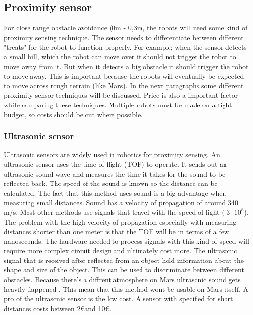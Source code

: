 \documentclass[10pt,a4paper]{article}
\begin{document}
\newpage

\subsection{Proximity sensor}
For close range obstacle avoidance (0m - 0,3m, the robots will need some kind of proximity sensing technique. The sensor needs to differentiate between different "treats" for the robot to function properly. For example; when the sensor detects a small hill, which the robot can move over it should not trigger the robot to move away from it. But when it detects a big obstacle it should trigger the robot to move away. This is important because the robots will eventually be expected to move across rough terrain (like Mars). In the next paragraphs some different proximity sensor techniques will be discussed. Price is also a important factor while comparing these techniques. Multiple robots must be made on a tight budget, so costs should be cut where possible.\\

\subsubsection{Ultrasonic sensor}
Ultrasonic sensors are widely used in robotics for proximity sensing. An ultrasonic sensor uses the time of flight (TOF) to operate. It sends out an ultrasonic sound wave and measures the time it takes for the sound to be reflected back. The speed of the sound is known so the distance can be calculated. The fact that this method uses sound is a big advantage when measuring small distances. Sound has a velocity of propagation of around 340 m/s. Most other methods use signals that travel with the speed of light ( $3\cdot10^{8}$). The problem with the high velocity of  propagation especially with measuring distances shorter than one meter is that the TOF will be in terms of a few nanoseconds.  The hardware needed to process signals with this kind of speed will require more complex circuit design and ultimately cost more. The ultrasonic signal that is received after reflected from an object hold information about the shape and size of the object. This can be used to discriminate between different obstacles\cite{ultraobject}. Because there's a diffrent atmosphere on Mars ultrasonic sound gets heavily dappened \cite{soundonmars}. This mean that this method wont be usable on Mars itself. A pro of the ultrasonic sensor is the low cost. A sensor with specified for short distances costs between 2\euro and 10\euro.
\end{document}
